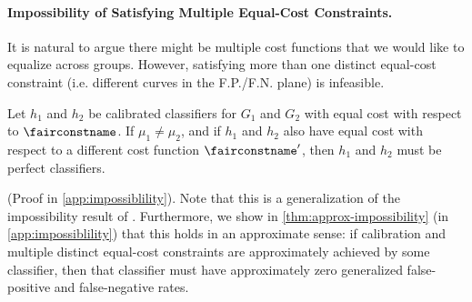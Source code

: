 
\paragraph{Impossibility of Satisfying Multiple Equal-Cost Constraints.}
\label{ssec:impossibility}
It is natural to argue there might be multiple cost functions that we
would like to equalize across groups.
However, satisfying more than one distinct
equal-cost constraint (i.e. different curves in the F.P./F.N. plane) is infeasible.
%
\begin{thm} \label{thm:impossibility}
  Let $h_1$ and $h_2$ be calibrated classifiers for $G_1$ and $G_2$ with equal
  cost with respect to
  $\fairconstname$.
  If $\mu_1 \ne \mu_2$, and if $h_1$ and $h_2$ also have equal cost with
  respect to a different cost function $\fairconstname'$, then $h_1$ and $h_2$
  must be perfect classifiers.
\end{thm}
%
(Proof in \autoref{app:impossiblility}). Note that this is
a generalization of the impossibility result of \cite{kleinberg2016inherent}.
Furthermore, we show in \autoref{thm:approx-impossibility} (in \autoref{app:impossiblility})
that this holds in an
approximate sense: if calibration and multiple distinct equal-cost constraints
are approximately achieved by some classifier, then that classifier must have
approximately zero generalized false-positive and false-negative rates.


%

